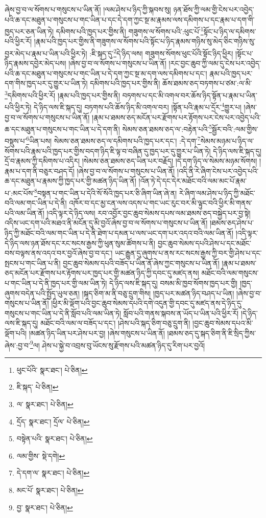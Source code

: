 ཞེས་བྱ་བ་ལ་སོགས་པ་གསུངས་པ་ཡིན་ནོ། །ལམ་ཤེས་པ་ཉིད་ཀྱི་སྐབས་སུ། ཉན་ཐོས་ཀྱི་ལམ་གྱི་ངེས་པར་འབྱེད་པའི་ཆ་དང་མཐུན་པ་གསུངས་པ་གང་ཡིན་པ་དང་དེ་དག་ཀྱང་སྔ་མ་རྣམས་ལས་དམིགས་པ་དང་རྣམ་པ་དག་གི་ཁྱད་པར་ཅན་ཡིན་ཏེ། དམིགས་པའི་ཁྱད་པར་གྱིས་ནི། གཟུགས་ལ་སོགས་པའི་:ཕུང་པོ་\footnote{ཕུང་པོའི་  སྣར་ཐང་།  པེ་ཅིན། }སྟོང་པ་ཉིད་ལ་དམིགས་པའི་ཕྱིར་རོ། །རྣམ་པའི་ཁྱད་པར་གྱིས་ནི་གཟུགས་ལ་སོགས་པའི་སྟོང་པ་ཉིད་རྣམས་གཉིས་སུ་མེད་ཅིང་གཉིས་སུ་བྱར་མེད་པ་རྣམ་པ་ཡིན་པའི་ཕྱིར་ཏེ། :ཇི་སྐད་དུ་\footnote{ཇི་སྐད་  པེ་ཅིན། }དེ་ཉིད་ལས། གཟུགས་སོགས་ཕུང་པོའི་སྟོང་ཉིད་ཕྱིར། །སྟོང་པ་ཉིད་རྣམས་དབྱེར་མེད་པས། །ཞེས་བྱ་བ་ལ་སོགས་པ་གསུངས་པ་ཡིན་ནོ། །རང་བྱང་ཆུབ་ཀྱི་ལམ་དུ་ངེས་པར་འབྱེད་པའི་ཆ་དང་མཐུན་པ་གསུངས་པ་གང་ཡིན་པ་དེ་དག་ཀྱང་སྔ་མ་དག་ལས་དམིགས་པ་དང་། རྣམ་པའི་ཁྱད་པར་དག་གིས་ཁྱད་པར་དུ་གྱུར་པ་ཡིན་ཏེ། དམིགས་པའི་ཁྱད་པར་གྱིས་ནི། ཆོས་ཐམས་ཅད་བཏགས་པ་ཙམ་:ལ་མི་\footnote{ལ་  སྣར་ཐང་།  པེ་ཅིན། }དམིགས་པའི་ཕྱིར་རོ། །རྣམ་པའི་ཁྱད་པར་གྱིས་ནི། བཏགས་པ་དང་མི་འགལ་བར་ཆོས་ཉིད་སྟོན་པ་རྣམ་པ་ཡིན་པའི་ཕྱིར་ཏེ། དེ་ཉིད་ལས་ཇི་སྐད་དུ། བཏགས་པའི་ཆོས་ཉིད་མི་འགལ་བར། །སྟོན་པའི་རྣམ་པ་དྲོར་\footnote{དྲོད་  སྣར་ཐང་། དྲོལ་  པེ་ཅིན། }གྱུར་པ། །ཞེས་བྱ་བ་ལ་སོགས་པ་གསུངས་པ་ཡིན་ནོ། །རྣམ་པ་ཐམས་ཅད་མངོན་པར་རྫོགས་པར་རྟོགས་པར་ངེས་པར་འབྱེད་པའི་ཆ་དང་མཐུན་པ་གསུངས་པ་གང་ཡིན་པ་དེ་དག་ནི། སེམས་ཅན་ཐམས་ཅད་ལ་:བརྟེན་པའི་\footnote{བསྟེན་པའི་  སྣར་ཐང་།  པེ་ཅིན། }སྦྱོར་བའི་:ལམ་གྱིས་བསྡུས་པ་\footnote{ལམ་གྱིས་  སྡེ་དགེ། }ཡིན་པས། སེམས་ཅན་ཐམས་ཅད་ལ་དམིགས་པའི་ཁྱད་པར་དང་། :དེ་དག་\footnote{དེ་དག་ལ་  སྣར་ཐང་།  པེ་ཅིན། }སེམས་མཉམ་པ་ཉིད་ལ་སོགས་པའི་རྣམ་པའི་ཁྱད་པར་གྱིས་བདག་ཉིད་ཇི་ལྟ་བ་བཞིན་དུ་ཁྱད་པར་དུ་གྱུར་པ་ཡིན་ཏེ། དེ་ཉིད་ལས་ཇི་སྐད་དུ། དྲོ་བ་རྣམས་ཀྱི་དམིགས་པ་འདིར། །སེམས་ཅན་ཐམས་ཅད་ཡིན་པར་བརྗོད། །དེ་དག་ཉིད་ལ་སེམས་མཉམ་སོགས། །རྣམ་པ་དག་ནི་བཅུར་བཤད་དོ། །ཞེས་བྱ་བ་ལ་སོགས་པ་གསུངས་པ་ཡིན་ནོ། །འདི་ནི་རེ་ཞིག་ངེས་པར་འབྱེད་པའི་ཆ་དང་མཐུན་པ་རྣམས་ཀྱི་ཁྱད་པར་གྱི་མཚན་ཉིད་ཡིན་ནོ། །འོན་ཏེ་དེ་དང་དེར་མཐོང་བའི་ལམ་མང་པོ་རྣམ་པ་:མང་པོས་\footnote{མང་པོ་  སྣར་ཐང་།  པེ་ཅིན། }བསྟན་པ་གང་ཡིན་པ་དེའི་སོ་སོའི་ཁྱད་པར་ཅི་ཞིག་ཡིན་ཞེ་ན། རེ་ཞིག་ལམ་ཤེས་པ་ཉིད་ཀྱི་མཐོང་བའི་ལམ་གང་ཡིན་པ་དེ་ནི། འཁོར་བ་དང་མྱ་ངན་ལས་འདས་པ་གང་ཡང་རུང་བར་མི་ལྟུང་བའི་ཕྱིར་མི་གནས་པའི་ལམ་ཡིན་ནོ། །འདི་ལྟར་དེ་ཉིད་ལས། རབ་འབྱོར་བྱང་ཆུབ་སེམས་དཔས་ལམ་ཐམས་ཅད་བསྐྱེད་པར་བྱ་སྟེ། འདིས་ཡང་དག་པའི་མཐའ་ནི་མངོན་དུ་མི་བྱའོ་ཞེས་བྱ་བ་ལ་སོགས་པ་གསུངས་པ་ཡིན་ནོ། །ཐམས་ཅད་ཤེས་པ་ཉིད་ཀྱི་མཐོང་བའི་ལམ་གང་ཡིན་པ་དེ་ནི་ཐེག་པ་དམན་པ་ལས་ཡང་དག་པར་འདའ་བའི་ལམ་ཡིན་ནོ། །འདི་ལྟར་དེ་ཉིད་ལས་ཉན་ཐོས་དང་རང་སངས་རྒྱས་ཀྱི་ཕུན་སུམ་ཚོགས་པ་ནི། བྱང་ཆུབ་སེམས་དཔའི་ཤེས་པ་དང་མཐོང་བས་བལྟས་ནས་འདའ་བར་བྱའོ་ཞེས་བྱ་བ་དང་། ཡང་རྒྱུན་དུ་ཞུགས་པ་ནས་རང་སངས་རྒྱས་ཀྱི་བར་གྱི་ཤེས་པ་དང་སྤངས་པ་གང་ཡིན་པ་ནི། བྱང་ཆུབ་སེམས་དཔའི་བཟོད་པ་ཡིན་ནོ་ཞེས་ཀྱང་གསུངས་པ་ཡིན་ནོ། །རྣམ་པ་ཐམས་ཅད་མངོན་པར་རྫོགས་པར་རྟོགས་པར་ཁྱད་པར་གྱི་མཚན་ཉིད་ཀྱི་དབང་དུ་མཛད་ནས། མཐོང་བའི་ལམ་གསུངས་པ་གང་ཡིན་པ་དེ་ནི་ཁྱད་པར་གྱི་ལམ་ཡིན་ཏེ། དེ་ཉིད་ལས་ཇི་སྐད་དུ། བསམ་མི་ཁྱབ་སོགས་ཁྱད་པར་གྱི། །ཁྱད་ཞུགས་བདེན་པའི་སྤྱོད་ཡུལ་ཅན། །སྐད་ཅིག་མ་ནི་བཅུ་དྲུག་གིས། །ཁྱད་པར་མཚན་ཉིད་བཤད་པ་ཡིན། །ཞེས་བྱ་བ་གསུངས་པ་ཡིན་ནོ། །ཕྱིར་མི་ལྡོག་པའི་བྱང་ཆུབ་སེམས་དཔའི་དགེ་འདུན་གྱི་དབང་དུ་མཛད་ནས་དེ་ཉིད་དུ་གསུངས་པ་གང་ཡིན་པ་དེ་ནི་སློབ་པའི་ལམ་ཡིན་ཏེ། སློབ་པའི་གནས་སྐབས་ན་ཡོད་པ་ཡིན་པའི་ཕྱིར་རོ། །དེ་ཉིད་ལས་ཇི་སྐད་དུ། མཐོང་བའི་ལམ་ལ་བཟོད་པ་དང་། །ཤེས་པའི་སྐད་ཅིག་བཅུ་དྲུག་ནི། །བྱང་ཆུབ་སེམས་དཔའ་མི་ལྡོག་པའི། །མཚན་ཉིད་ཡིན་པར་ཤེས་པར་བྱ། །ཞེས་གསུངས་པ་ཡིན་ནོ། །ཐམས་ཅད་དུ་སྐད་ཅིག་ནི་ཇི་སྲིད་ཀྱིས་ཞེས་:བྱ་བ་\footnote{བྱ་  སྣར་ཐང་།  པེ་ཅིན། }ལ། ཤེས་པ་སྐྱེ་བ་འབྲས་བུ་ཡོངས་སུ་རྫོགས་པའི་མཚན་ཉིད་དུ་རིག་པར་བྱའོ། 